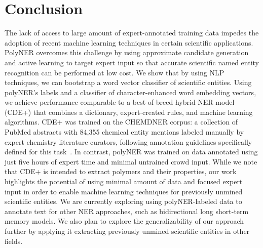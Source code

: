 \section{Conclusion}
\label{sect:apner_conclusion}
The lack of access to large amount of expert-annotated training data impedes the adoption of recent machine learning techniques in certain scientific applications.
PolyNER overcomes this challenge by %
using
approximate candidate generation and active learning to target 
expert input so that accurate scientific named entity recognition can be performed at low cost.
We show that by using NLP techniques, we can bootstrap a word vector classifier of scientific entities.
Using polyNER's labels and a classifier of character-enhanced word embedding vectors, we achieve 
performance comparable to a best-of-breed
hybrid NER model (CDE+) that combines a dictionary, expert-created
rules, and machine learning algorithms.
CDE+ was trained on the CHEMDNER corpus:
a collection of  PubMed abstracts with 84,355 chemical entity mentions labeled manually by expert chemistry literature curators, following annotation guidelines specifically defined for this task~\cite{krallinger2015chemdner}. 
In contrast, polyNER was trained on data annotated using just five hours of expert time and minimal untrained crowd input.
While we note that CDE+ is intended to extract polymers and their properties, 
our work highlights the potential of using minimal amount of data and focused expert input in order to enable machine learning techniques for previously unmined scientific entities. 
We are currently exploring using polyNER-labeled data to annotate text for other NER approaches,
such as bidirectional long short-term memory models.
We also plan to explore the generalizability of our approach further by applying it extracting previously unmined scientific entities in other fields.

